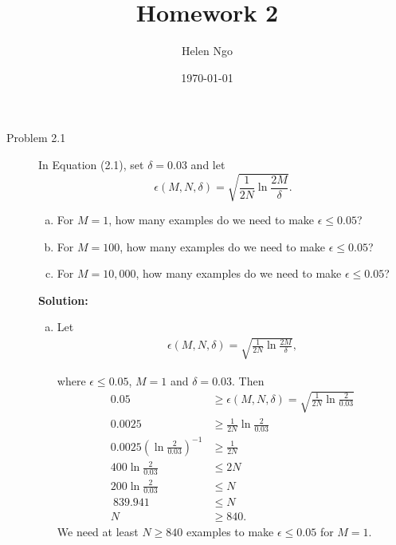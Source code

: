 \documentclass[a4paper]{article}
\title{Homework 2}
\author{Helen Ngo}
\date{\today}
\begin{document}
\lstset{language=Python}

\maketitle

\begin {description}

\item[Problem 2.1] In Equation (2.1), set $\delta = 0.03$ and let 
\[\epsilon(M, N, \delta) = \sqrt{\frac{1}{2N}\ln\frac{2M}{\delta}}.\]

\begin{enumerate}[(a)]
\item For $M=1$, how many examples do we need to make $\epsilon \leq 0.05$?
\item For $M=100$, how many examples do we need to make $\epsilon \leq 0.05$?
\item For $M=10,000$, how many examples do we need to make $\epsilon \leq 0.05$?
\end{enumerate}

\smallskip

\textbf{Solution:}
\begin{doublespace}
\begin{enumerate}[(a)]

\item Let 
\begin{equation}
 	\begin{aligned}
	\label{eq1}
		\epsilon(M, N, \delta) = \sqrt{\frac{1}{2N}\ln\frac{2M}{\delta}},
 	\end{aligned}
\end{equation}

where $\epsilon \leq 0.05$, $M = 1$ and $\delta = 0.03$. Then
\begin{align*}
0.05 &\geq \epsilon(M, N, \delta) = \sqrt{\frac{1}{2N}\ln\frac{2}{0.03}} \\
0.0025 &\geq \frac{1}{2N}\ln\frac{2}{0.03} \\
0.0025\left( \ln\frac{2}{0.03} \right)^{-1} &\geq \frac{1}{2N} \\
400 \ln\frac{2}{0.03} &\leq 2N \\
200 \ln\frac{2}{0.03} &\leq N \\
~839.941 &\leq N \\
N &\geq 840.
\end{align*}
We need at least $N \geq 840$ examples to make $\epsilon \leq 0.05$ for $M=1$.


\end{enumerate}
\end{doublespace}
\end{description}
\end{document}
